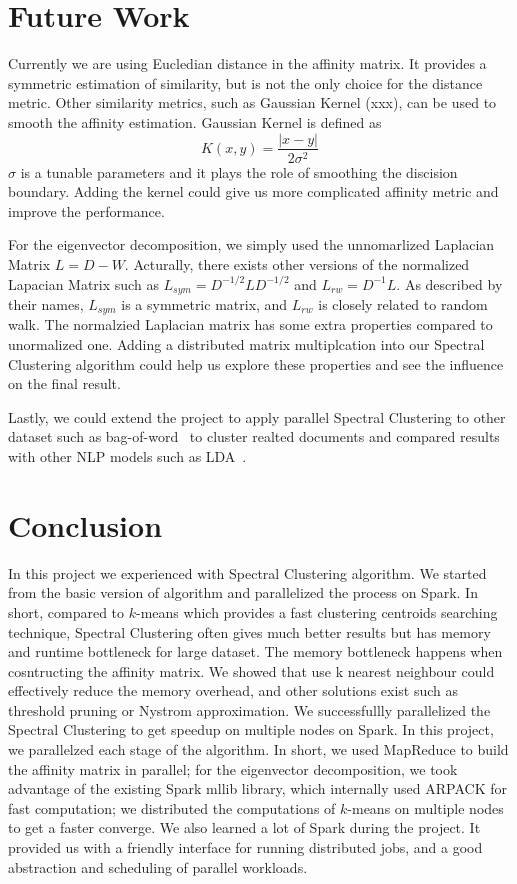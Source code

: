 \documentclass{acm_proc_article-sp}
\begin{document}
\section{Future Work}
Currently we are using Eucledian distance in the affinity matrix. It provides a symmetric estimation of similarity, but is not the only choice for the distance metric. Other similarity metrics, such as Gaussian Kernel (xxx), can be used to smooth the affinity estimation. Gaussian Kernel is defined as $$K(x, y) = \frac{|x - y|}{2\sigma^2}$$ $\sigma$ is a tunable parameters and it plays the role of smoothing the discision boundary. Adding the kernel could give us more complicated affinity metric and improve the performance.

For the eigenvector decomposition, we simply used the unnomarlized Laplacian Matrix $L = D - W$. Acturally, there exists other versions of the normalized Lapacian Matrix such as $L_{sym} = D^{-1/2}LD^{-1/2}$ and $L_{rw} = D^{-1}L$. As described by their names, $L_{sym}$ is a symmetric matrix, and $L_{rw}$ is closely related to random walk. The normalzied Laplacian matrix has some extra properties compared to unormalized one. Adding a distributed matrix multiplcation into our Spectral Clustering algorithm could help us explore these properties and see the influence on the final result.

Lastly, we could extend the project to apply parallel Spectral Clustering to other dataset such as bag-of-word~\cite{Lichman:2013} to cluster realted documents and compared results with other NLP models such as LDA~\cite{blei2003latent}.

\section{Conclusion}
In this project we experienced with Spectral Clustering algorithm. We started from the basic version of algorithm and parallelized the process on Spark. In short, compared to $k$-means which provides a fast clustering centroids searching technique, Spectral Clustering often gives much better results but has memory and runtime bottleneck for large dataset. The memory bottleneck happens when cosntructing the affinity matrix. We showed that use k nearest neighbour could effectively reduce the memory overhead, and other solutions exist such as threshold pruning or Nystrom approximation. We successfullly parallelized the Spectral Clustering to get speedup on multiple nodes on Spark. In this project, we parallelzed each stage of the algorithm. In short, we used MapReduce to build the affinity matrix in parallel; for the eigenvector decomposition, we took advantage of the existing Spark mllib library, which internally used ARPACK for fast computation; we distributed the computations of $k$-means on multiple nodes to get a faster converge. We also learned a lot of Spark during the project. It provided us with a friendly interface for running distributed jobs, and a good abstraction and scheduling of parallel workloads.
\end{document}
